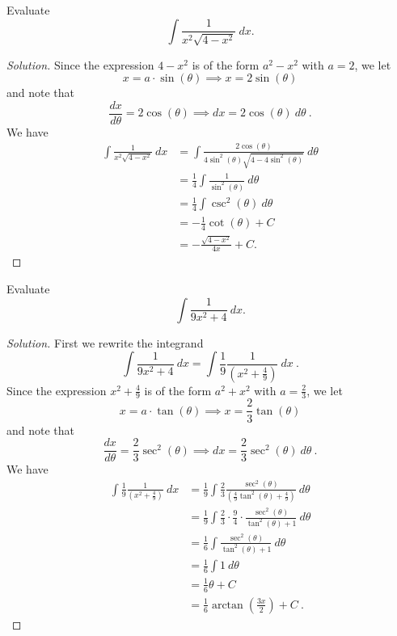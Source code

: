 \documentclass[compacto,10pt,comentarios]{aleph-notas}
\begin{document}
\begin{ejer}
    Evaluate
    $$
        \int \frac{1}{x^{2}\sqrt{4 - x^2}} ~ dx.
    $$
\end{ejer}
\begin{proof}[Solution]
    Since the expression $4 - x^{2}$ is of the form $a^{2} - x^{2}$ with $a = 2$, we let
    $$
        x = a \cdot \sin(\theta) \implies x = 2\sin(\theta)
    $$
    and note that
    $$
        \frac{dx}{d\theta} = 2\cos(\theta) \implies dx = 2\cos(\theta) ~ d\theta  ~.
    $$
    We have
    \begin{align*}
        \int \frac{1}{x^{2}\sqrt{4 - x^2}} ~ dx
        & = \int \frac{2\cos(\theta)}{4\sin^{2}(\theta)\sqrt{4 - 4\sin^{2}(\theta)}} ~ d\theta \\
        & = \frac{1}{4} \int \frac{1}{\sin^{2}(\theta)} ~ d\theta \\
        & = \frac{1}{4} \int \csc^{2}(\theta) ~ d\theta \\
        & = -\frac{1}{4} \cot(\theta) + C \\
        & = -\frac{\sqrt{4 - x^2}}{4x} + C .
    \end{align*}
\end{proof}

\begin{ejer}
    Evaluate
    $$
        \int \frac{1}{9x^2 + 4} ~ dx.
    $$
\end{ejer}
\begin{proof}[Solution]
    First we rewrite the integrand
    $$
        \int \frac{1}{9x^2 + 4} ~ dx = \int \frac{1}{9} \frac{1}{\left( x^{2} + \frac{4}{9}\right)} ~ dx ~ .
    $$
    Since the expression $x^{2} + \frac{4}{9}$ is of the form $a^{2} + x^{2}$ with $a = \frac{2}{3}$, we let
    $$
        x = a \cdot \tan(\theta) \implies x = \frac{2}{3}\tan(\theta)
    $$
    and note that
    $$
        \frac{dx}{d\theta} = \frac{2}{3}\sec^{2}(\theta) \implies dx = \frac{2}{3}\sec^{2}(\theta) ~ d\theta  ~.
    $$
    We have
    \begin{align*}
        \int \frac{1}{9} \frac{1}{\left( x^{2} + \frac{4}{9}\right)} ~ dx
        & = \frac{1}{9} \int \frac{2}{3}\frac{\sec^{2}(\theta)}{\left( \frac{4}{9}\tan^2(\theta) + \frac{4}{9} \right)} ~ d\theta \\
        & = \frac{1}{9} \int \frac{2}{3} \cdot \frac{9}{4} \cdot \frac{\sec^{2}(\theta)}{\tan^{2}(\theta) + 1} ~ d\theta \\
        & = \frac{1}{6} \int \frac{\sec^{2}(\theta)}{\tan^{2}(\theta) + 1} ~ d\theta \\
        & = \frac{1}{6} \int 1 ~ d\theta \\
        & = \frac{1}{6} \theta + C \\
        & = \frac{1}{6} \arctan\left( \frac{3x}{2} \right) + C ~.
    \end{align*}
\end{proof}
\end{document}
